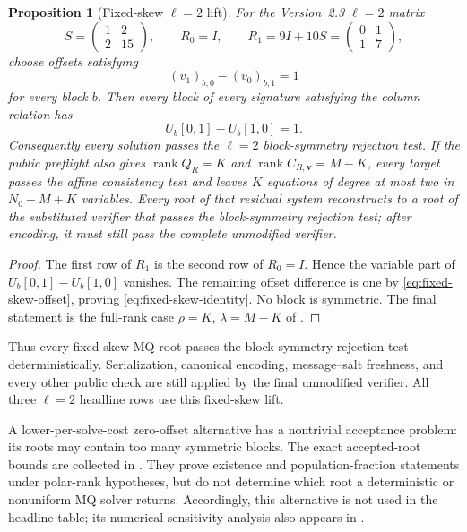 \documentclass[11pt]{article}
\newtheorem{proposition}[proposition]{Proposition}
\newcommand{\rank}{\operatorname{rank}}
\begin{document}
\begin{proposition}[Fixed-skew $\ell=2$ lift]\label{prop:fixed-skew}
For the Version~2.3 $\ell=2$ matrix
\[
 S=\begin{pmatrix}1&2\\2&15\end{pmatrix},
 \qquad R_0=I,
 \qquad R_1=9I+10S=\begin{pmatrix}0&1\\1&7\end{pmatrix},
\]
choose offsets satisfying
\begin{equation}\label{eq:fixed-skew-offset}
 (v_1)_{b,0}-(v_0)_{b,1}=1
\end{equation}
for every block $b$.  Then every block of every signature satisfying the
column relation has
\begin{equation}\label{eq:fixed-skew-identity}
 U_b[0,1]-U_b[1,0]=1.
\end{equation}
Consequently every solution passes the $\ell=2$ block-symmetry rejection
test.  If the public preflight also gives
$\rank Q_R=K$ and $\rank C_{R,\mathbf v}=M-K$, every target passes the
affine consistency test and leaves $K$ equations of degree at most two in
$N_0-M+K$ variables.  Every root of that residual system reconstructs to a
root of the substituted verifier that passes the block-symmetry rejection
test; after encoding, it must still pass the complete unmodified verifier.
\end{proposition}

\begin{proof}
The first row of $R_1$ is the second row of $R_0=I$.  Hence the variable part
of $U_b[0,1]-U_b[1,0]$ vanishes.  The remaining offset difference is one by
\eqref{eq:fixed-skew-offset}, proving \eqref{eq:fixed-skew-identity}.  No block
is symmetric.  The final statement is the full-rank case
$\rho=K$, $\lambda=M-K$ of .
\end{proof}

Thus every fixed-skew MQ root passes the block-symmetry rejection test
deterministically.  Serialization, canonical encoding,
message--salt freshness, and every other public check are still applied by the
final unmodified verifier.  All three $\ell=2$ headline rows use this
fixed-skew lift.

A lower-per-solve-cost zero-offset alternative has a nontrivial acceptance
problem: its roots may contain too many symmetric blocks.  The exact
accepted-root bounds are collected in .  They prove
existence and population-fraction statements under polar-rank hypotheses, but
do not determine which root a deterministic or nonuniform MQ solver returns.
Accordingly, this alternative is not used in the headline table; its numerical
sensitivity analysis also appears in .
\end{document}
